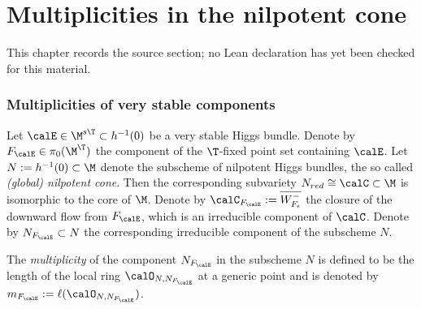 \chapter{Multiplicities in the nilpotent cone}
\label{very-stable-higgs-bundles-equivariant-multiplicity-mirror-symmetry-chapter-05}

\begin{remark}
\label{very-stable-higgs-bundles-equivariant-multiplicity-mirror-symmetry-chapter-05-source}
This chapter records the source section; no Lean declaration has yet been checked for this material.
\notready
\end{remark}

\label{multiplicities}

\subsection{Multiplicities of very stable components}
Let $\calE\in \M^{s \T}\subset h^{-1}(0)$ be a very stable Higgs bundle. Denote by $F_\calE\in \pi_{0}(\M^{ \T})$ the component of the $\T$-fixed point set containing $\calE$.   Let $N:=h^{-1}(0)\subset \M$ denote the subscheme of nilpotent Higgs bundles, the so called {\em (global) nilpotent cone}. Then the corresponding subvariety $N_{red}\cong \calC\subset \M$ is isomorphic to the core of $\M$. Denote by $\calC_{F_{\calE}}:= \overline{W^-_{F_\epsilon}}$ the closure of the downward flow from $F_\calE$, which is an irreducible component of $\calC$. Denote by $N_{F_{\calE}}\subset N$ the corresponding irreducible component of the subscheme $N$.

\begin{definition}
\notready \label{defmult} The {\em multiplicity} of the component $N_{F_\calE}$   in the subscheme $N$ is defined to be the length of the local ring $\calO_{N,N_{{F_\calE}}}$ at a generic point  and is  denoted by $m_{F_\calE}:=\ell(\calO_{N,N_{{F_\calE}}})$.
\end{definition}


